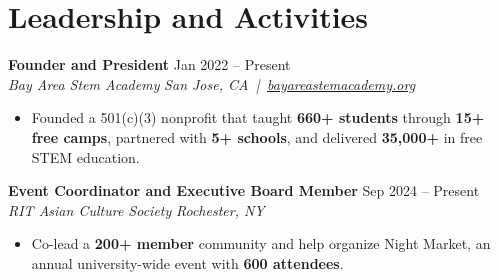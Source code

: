 \documentclass[10pt,letterpaper]{article}
\newif\ifresumeFirstRole
\newcommand{\resumeRole}[4]{%
  \ifresumeFirstRole
    \global\resumeFirstRolefalse
  \else
    \vspace{0pt plus 1fill}%
  \fi
  \textbf{#1} \hfill #2\\
  \textit{#3} \hfill \textit{#4}
}
\begin{document}
\section*{Leadership and Activities}
\resumeRole{Founder and President}{Jan 2022 -- Present}{Bay Area Stem Academy}{San Jose, CA \,|\, \href{https://bayareastemacademy.org}{bayareastemacademy.org}}
\begin{itemize}
  \item Founded a 501(c)(3) nonprofit that taught \textbf{660+ students} through \textbf{15+ free camps}, partnered with \textbf{5+ schools}, and delivered \textbf{\textdollar{}35,000+} in free STEM education.
\end{itemize}

\resumeRole{Event Coordinator and Executive Board Member}{Sep 2024 -- Present}{RIT Asian Culture Society}{Rochester, NY}
\begin{itemize}
  \item Co-lead a \textbf{200+ member} community and help organize Night Market, an annual university-wide event with \textbf{600 attendees}.
\end{itemize}
\end{document}
